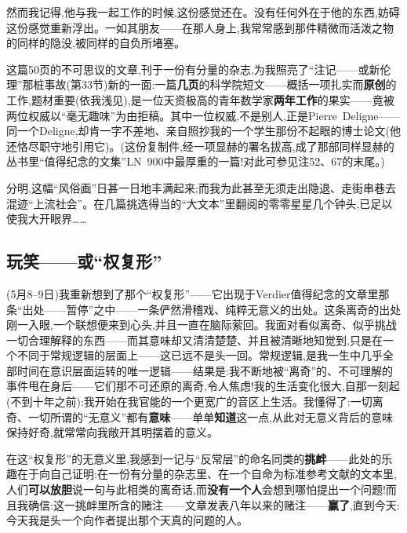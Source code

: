 然而我记得,他与我一起工作的时候,这份感觉还在。没有任何外在于他的东西,妨碍这份感觉\dmark{}重新浮出。一如其朋友——在那人身上,我常常感到那件精微而活泼之物的同样的隐没,被同样的自负所堵塞。

这篇50页的不可思议的文章,刊于一份有分量的杂志,为我照亮了“注记——或新伦理”那桩事故(第33节)新的一面:一篇\textbf{几页}的科学院短文——概括一项扎实而\textbf{原创}的工作,题材重要(依我浅见),是一位天资极高的青年数学家\textbf{两年工作}的果实——竟被两位权威以“毫无趣味”为由拒稿。其中一位权威,不是别人,正是Pierre~Deligne——同一个Deligne,却肯一字不差地、亲自照抄我的一个学生那份不起眼的博士论文(他还恪尽职守地引用它)。(这份复制件,经一项显赫的署名拔高,成了那部同样显赫的丛书里“值得纪念的文集”LN~900中最厚重的一篇!对此可参见注52、67的末尾。)

分明,这幅“风俗画”日甚一日地丰满起来;而我为此甚至无须走出隐退、走街串巷去混迹“上流社会”。在几篇挑选得当的“大文本”里翻阅的零零星星几个钟头,已足以使我大开眼界……

\subsection{玩笑——或“权复形”}


(5月8--9日)我重新想到了那个“权复形”——它出现于Verdier值得纪念的文章里那条“出处——暂停”之中——一条俨然滑稽戏、纯粹无意义的出处。这条离奇的出处刚一入眼,一个联想便来到心头,并且一直在脑际萦回。我面对看似离奇、似乎挑战一切合理解释的东西——而其意味却又清清楚楚、并且被清晰地知觉到,只是在一个不同于常规逻辑的层面上——这已远不是头一回。常规逻辑,是我一生中几乎全部时间在意识层面运转的唯一逻辑——结果是:我不断地被“离奇”的、不可理解的事件甩在身后——它们那不可还原的离奇,令人焦虑!我的生活变化很大,自那一刻起(不到十年之前):我开始在我官能的一个更宽广的音区上生活。我懂得了:一切离奇、一切所谓的“无意义”都有\textbf{意味}——单单\textbf{知道}这一点\dmark{},从此对无意义背后的意味保持好奇,就常常向我敞开其明摆着的意义。

在这“权复形”的无意义里,我感到一记与“反常层”的命名同类的\textbf{挑衅}——此处的乐趣在于向自己证明:在一份有分量的杂志里、在一个自命为标准参考文献的文本里,人们\textbf{可以放胆}说一句与此相类的离奇话,而\textbf{没有一个人}会想到哪怕提出一个问题!而且我确信:这一挑衅里所含的赌注——文章发表八年以来的赌注——\textbf{赢了},直到今天:今天我是头一个向作者提出那个天真的问题的人。

